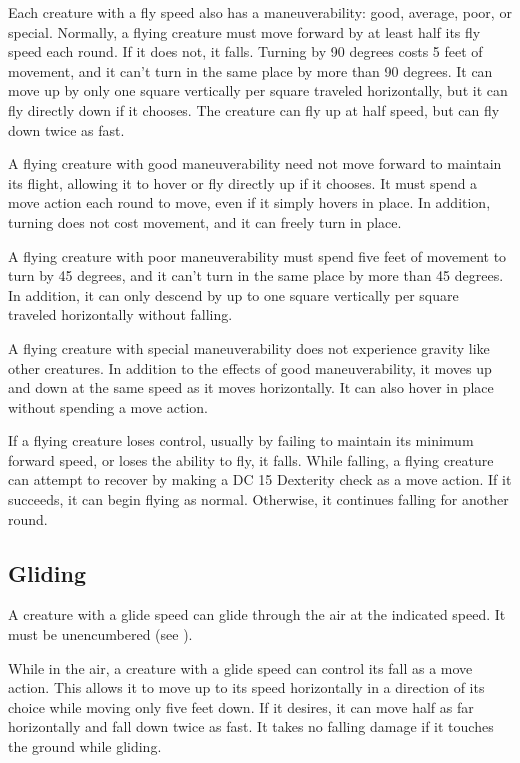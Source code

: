 Each creature with a fly speed also has a maneuverability: good, average, poor, or special. Normally, a flying creature must move forward by at least half its fly speed each round. If it does not, it falls. Turning by 90 degrees costs 5 feet of movement, and it can't turn in the same place by more than 90 degrees. It can move up by only one square vertically per square traveled horizontally, but it can fly directly down if it chooses. The creature can fly up at half speed, but can fly down twice as fast.

 A flying creature with good maneuverability need not move forward to maintain its flight, allowing it to hover or fly directly up if it chooses. It must spend a move action each round to move, even if it simply hovers in place. In addition, turning does not cost movement, and it can freely turn in place.

 A flying creature with poor maneuverability must spend five feet of movement to turn by 45 degrees, and it can't turn in the same place by more than 45 degrees. In addition, it can only descend by up to one square vertically per square traveled horizontally without falling.

 A flying creature with special maneuverability does not experience gravity like other creatures. In addition to the effects of good maneuverability, it moves up and down at the same speed as it moves horizontally. It can also hover in place without spending a move action.

 If a flying creature loses control, usually by failing to maintain its minimum forward speed, or loses the ability to fly, it falls. While falling, a flying creature can attempt to recover by making a DC 15 Dexterity check as a move action. If it succeeds, it can begin flying as normal. Otherwise, it continues falling for another round.

\subsection{Gliding}\label{Gliding}
A creature with a glide speed can glide through the air at the indicated speed. It must be unencumbered (see ).

While in the air, a creature with a glide speed can control its fall as a move action. This allows it to move up to its speed horizontally in a direction of its choice while moving only five feet down. If it desires, it can move half as far horizontally and fall down twice as fast. It takes no falling damage if it touches the ground while gliding.

